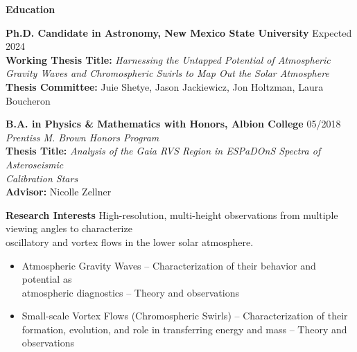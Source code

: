 \documentclass{resume} %
\begin{document}
\vspace{-0.1in}
\begin{rSection}{\textbf{Education}}
\vspace{0.02in}

{\bf Ph.D. Candidate in Astronomy, New Mexico State University} \hfill {Expected 2024}
\vspace{0.04in}
\\ 
{\bf Working Thesis Title:} 
\emph{Harnessing the Untapped Potential of Atmospheric Gravity Waves and Chromospheric Swirls to Map Out the Solar Atmosphere}
\vspace{0.04in}
\\ 
{\bf Thesis Committee:} Juie Shetye, Jason Jackiewicz, Jon Holtzman, Laura Boucheron
\vspace{0.15in}

{\bf B.A. in Physics \& Mathematics with Honors, Albion College}  \hfill {05/2018}
\vspace{0.04in} \\
{\emph{Prentiss M. Brown Honors Program} }
\vspace{0.04in} \\
{\bf Thesis Title:} \emph{Analysis of the Gaia RVS Region in ESPaDOnS Spectra of Asteroseismic \\ Calibration Stars}
\vspace{0.04in}
\\ 
{\bf Advisor:} Nicolle Zellner 
\end{rSection}

\vspace{-0.1in}
\begin{rSection}{\textbf{Research Interests}}
\vspace{0.02in}
High-resolution, multi-height observations from multiple viewing angles to characterize \\ oscillatory and vortex flows in the lower solar atmosphere.
\vspace{0.02in}
\begin{itemize}
    \item Atmospheric Gravity Waves -- Characterization of their behavior and potential as \\ atmospheric diagnostics -- Theory and observations
    \item Small-scale Vortex Flows (Chromospheric Swirls) -- 
    Characterization of their formation, evolution, and role in transferring energy and mass -- Theory and observations
\end{itemize}
\end{rSection}
\end{document}
